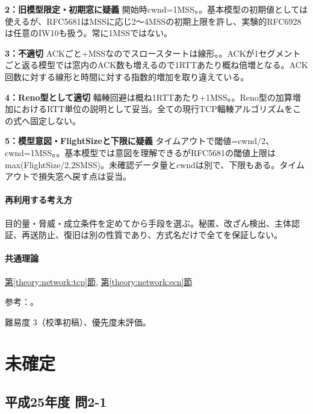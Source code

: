 \noindent\textbf{2：旧模型限定・初期窓に疑義} 開始時cwnd=\allowbreak{}1MSS。。基本模型の初期値としては使えるが、RFC5681はMSSに応じ2〜4MSSの初期上限を許し、実験的RFC6928は任意のIW10も扱う。常に1MSSではない。\par

\noindent\textbf{3：不適切} ACKごと+MSSなのでスロースタートは線形。。ACKが1セグメントごと返る模型では窓内のACK数も増えるので1RTTあたり概ね倍増となる。ACK回数に対する線形と時間に対する指数的増加を取り違えている。\par

\noindent\textbf{4：Reno型として適切} 輻輳回避は概ね1RTTあたり+1MSS。。Reno型の加算増加におけるRTT単位の説明として妥当。全ての現行TCP輻輳アルゴリズムをこの式へ固定しない。\par

\noindent\textbf{5：模型意図・FlightSizeと下限に疑義} タイムアウトで閾値=cwnd/2、cwnd=\allowbreak{}1MSS。。基本模型では意図を理解できるがRFC5681の閾値上限はmax(FlightSize/2,2SMSS)。未確認データ量とcwndは別で、下限もある。タイムアウトで損失窓へ戻す点は妥当。\par

\paragraph{再利用する考え方} 目的量・脅威・成立条件を定めてから手段を選ぶ。秘匿、改ざん検出、主体認証、再送防止、復旧は別の性質であり、方式名だけで全てを保証しない。

\paragraph{共通理論} \hyperref[theory:network:tcp]{第\ref*{theory:network:tcp}節}, \hyperref[theory:network:ecn]{第\ref*{theory:network:ecn}節}

\par 参考：\cite{net_tcp2009,net_ecn2001,net_iw2013}。

\par 難易度 3（校準初稿）、優先度未評価。

\section{未確定}

\subsection{平成25年度 問2-1}
\label{q:h25-reg-basic-2-1}

